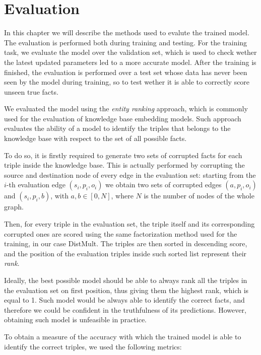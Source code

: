 \documentclass[%
    corpo=13.5pt,
    twoside,
    oldstyle,
    tipotesi=magistrale,
    greek,
    evenboxes
]{toptesi}
\begin{document}
\chapter{Evaluation}

In this chapter we will describe the methods used to evalute the trained
model.
The evaluation is performed both during training and testing. For the training
task, we evaluate the model over the validation set, which is used to check
wether the latest updated parameters led to a more accurate model.
After the training is finished, the evaluation is performed over a test set
whose data has never been seen by the model during training, so to test
wether it is able to correctly score unseen true facts.

We evaluated the model using the \emph{entity ranking} approach, which is
commonly used for the evaluation of knowledge base embedding models.
Such approach evaluates the ability of a model to identify the triples that
belongs to the knowledge base with respect to the set of all possible facts.

To do so, it is firstly required to generate two sets of corrupted facts for
each triple inside the knowledge base.
This is actually performed by corrupting the source and destination
node of every edge in the evaluation set:
starting from the $i$-th evaluation edge $(s_i,p_i,o_i)$ we obtain
two sets of corrupted edges $(a,p_i,o_i)$ and $(s_i,p_i,b)$, with
$a,b \in [0, N]$, where $N$ is the number of nodes of the whole graph.

Then, for every triple in the evaluation set, the triple itself and its
corresponding corrupted ones are scored
using the same factorization method used for the training, in our case DistMult.
The triples are then sorted in descending score, and the position of
the evaluation triples inside such sorted list represent their \emph{rank}.

Ideally, the best possible model should be able to always rank all the triples
in the evaluation set on first position, thus giving them the highest rank,
which is equal to 1.
Such model would be always able to identify the correct facts, and therefore we
could be confident in the truthfulness of its predictions.
However, obtaining such model is unfeasible in practice.
\newline

To obtain a measure of the accuracy with which the trained model is able to
identify the correct triples, we used the following metrics:
\end{document}
